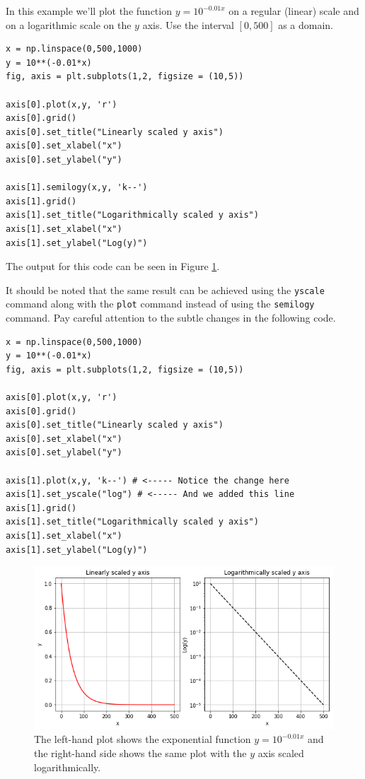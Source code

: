 \begin{example}
    In this example we'll plot the function $y = 10^{-0.01x}$ on a regular (linear) scale
    and on a logarithmic scale on the $y$ axis.  Use the interval $[0,500]$ as a domain.

\bcode
\begin{lstlisting}
x = np.linspace(0,500,1000)
y = 10**(-0.01*x)
fig, axis = plt.subplots(1,2, figsize = (10,5))

axis[0].plot(x,y, 'r')
axis[0].grid()
axis[0].set_title("Linearly scaled y axis")
axis[0].set_xlabel("x")
axis[0].set_ylabel("y")

axis[1].semilogy(x,y, 'k--')
axis[1].grid()
axis[1].set_title("Logarithmically scaled y axis")
axis[1].set_xlabel("x")
axis[1].set_ylabel("Log(y)")
\end{lstlisting}
The output for this code can be seen in Figure \ref{fig:matplotlib_4}.

It should be noted that the same result can be achieved using the \texttt{yscale} command
along with the \texttt{plot} command instead of using the \texttt{semilogy} command.  Pay
careful attention to the subtle changes in the following code.

\bcode
\begin{lstlisting}
x = np.linspace(0,500,1000)
y = 10**(-0.01*x)
fig, axis = plt.subplots(1,2, figsize = (10,5))

axis[0].plot(x,y, 'r')
axis[0].grid()
axis[0].set_title("Linearly scaled y axis")
axis[0].set_xlabel("x")
axis[0].set_ylabel("y")

axis[1].plot(x,y, 'k--') # <----- Notice the change here
axis[1].set_yscale("log") # <----- And we added this line
axis[1].grid()
axis[1].set_title("Logarithmically scaled y axis")
axis[1].set_xlabel("x")
axis[1].set_ylabel("Log(y)")
\end{lstlisting}
\end{example}

\begin{figure}[ht!]
    \centering
    \includegraphics[width=0.9\columnwidth]{Images/matplotlib_4.png}
    \caption{The left-hand plot shows the exponential function $y = 10^{-0.01x}$ and the
right-hand side shows the same plot with the $y$ axis scaled logarithmically.}
    \label{fig:matplotlib_4}
\end{figure}


